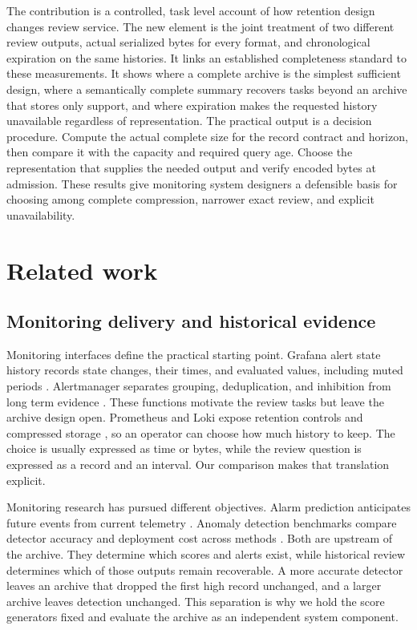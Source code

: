\documentclass[a4paper,fleqn]{cas-dc}
\begin{document}
The contribution is a controlled, task level account of how retention design changes review service. The new element is the joint treatment of two different review outputs, actual serialized bytes for every format, and chronological expiration on the same histories. It links an established completeness standard to these measurements. It shows where a complete archive is the simplest sufficient design, where a semantically complete summary recovers tasks beyond an archive that stores only support, and where expiration makes the requested history unavailable regardless of representation. The practical output is a decision procedure. Compute the actual complete size for the record contract and horizon, then compare it with the capacity and required query age. Choose the representation that supplies the needed output and verify encoded bytes at admission. These results give monitoring system designers a defensible basis for choosing among complete compression, narrower exact review, and explicit unavailability.

\section{Related work}\label{sec:related}

\subsection{Monitoring delivery and historical evidence}

Monitoring interfaces define the practical starting point. Grafana alert state history records state changes, their times, and evaluated values, including muted periods \cite{Grafana2026State}. Alertmanager separates grouping, deduplication, and inhibition from long term evidence \cite{Prom2026Alertmanager}. These functions motivate the review tasks but leave the archive design open. Prometheus and Loki expose retention controls and compressed storage \cite{Prom2026Storage,Grafana2026Loki}, so an operator can choose how much history to keep. The choice is usually expressed as time or bytes, while the review question is expressed as a record and an interval. Our comparison makes that translation explicit.

Monitoring research has pursued different objectives. Alarm prediction anticipates future events from current telemetry \cite{Strem2025APT}. Anomaly detection benchmarks compare detector accuracy and deployment cost across methods \cite{Mejri2024Evaluation}. Both are upstream of the archive. They determine which scores and alerts exist, while historical review determines which of those outputs remain recoverable. A more accurate detector leaves an archive that dropped the first high record unchanged, and a larger archive leaves detection unchanged. This separation is why we hold the score generators fixed and evaluate the archive as an independent system component.
\end{document}
